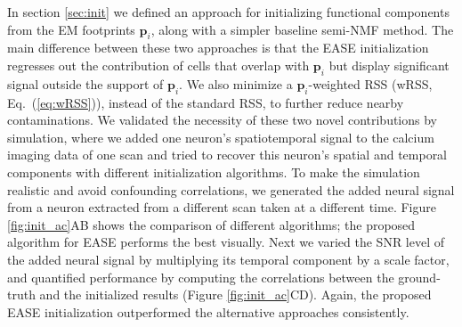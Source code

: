 \documentclass[10pt,letterpaper]{article}
\begin{document}
{%

In section \ref{sec:init} we defined an approach for initializing functional components from the EM footprints $\bm{p}_i$, along with a simpler baseline semi-NMF method.  The main difference between these two approaches is that the EASE initialization regresses out the contribution of cells that overlap with $\bm{p}_i$ but display significant signal outside the support of $\bm{p}_i$.  We also  minimize a $\bm{p}_i$-weighted RSS (wRSS, Eq.~(\ref{eq:wRSS})), instead of the standard RSS, to further reduce nearby contaminations. We validated the necessity of these two novel contributions by simulation, where we added one neuron's spatiotemporal signal to the calcium imaging data of one scan and tried to recover this neuron's spatial and temporal components with different initialization algorithms. To make the simulation realistic and avoid confounding correlations, we generated the added neural signal from a neuron extracted from a different scan taken at a different time. Figure \ref{fig:init_ac}AB shows the comparison of different algorithms; the proposed algorithm for EASE performs the best visually. Next we varied the SNR level of the added neural signal by multiplying its temporal component by a scale factor, and quantified performance by computing the correlations between the ground-truth and the initialized results (Figure \ref{fig:init_ac}CD). Again, the proposed EASE initialization outperformed the alternative approaches consistently. %

}
\end{document}
